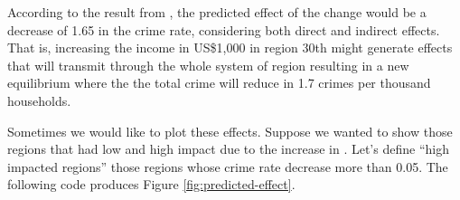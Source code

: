 According to the result from ,  the predicted effect of the change would be a decrease of 1.65 in the crime rate, considering both direct and indirect effects. That is, increasing the income in US\$1,000 in region 30th might generate effects that will transmit through the whole system of region resulting in a new equilibrium where the the total crime will reduce in 1.7 crimes per thousand households. 

Sometimes we would like to plot these effects. Suppose we wanted to show those regions that had low and high impact due to the increase in . Let's define ``high impacted regions'' those regions whose crime rate decrease more than 0.05. The following code produces Figure \ref{fig:predicted-effect}. 

\begin{knitrout}
\color{fgcolor}\begin{kframe}
\begin{alltt}
 \hlkwb{<-} \hlstd{(}\hlopt{$} \hlopt{-}\hlstd{,} \hlopt{$}
 \hlkwb{<-} \hlstd{(}\hlstd{,} \hlstd{)}
     \hlkwb{<-} \hlopt{$}
 \hlkwb{<-} \hlstd{(}\hlstd{,} \hlstd{)}

  
\hlstd{(}\hlstd{,}      \hlstd{=} \hlstd{)}
\hlstd{(}\hlstd{,} \hlstd{,}  \hlstd{=} \hlstd{,}  \hlstd{=} \hlstd{,}  \hlstd{=} \hlstd{)}
\end{alltt}
\end{kframe}
\end{knitrout}


